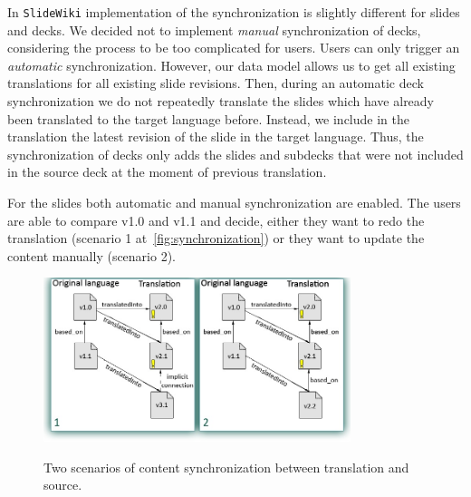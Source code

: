 \documentclass[PhD, Submit, ngerman,UKenglish,table]{scrbook}
\begin{document}
In \texttt{SlideWiki} implementation of the synchronization is slightly different for slides and decks. 
We decided not to implement \emph{manual} synchronization of decks, considering the process to be too complicated for users.
Users can only trigger an \emph{automatic} synchronization.
However, our  data model allows us to get all existing translations for all existing slide revisions.
Then, during an automatic deck synchronization we do not repeatedly translate the slides which have already been translated to the target language before.
Instead, we include in the translation the latest revision of the slide in the target language.
Thus, the synchronization of decks only adds the slides and subdecks that were not included in the source deck at the moment of previous translation.

For the slides both automatic and manual synchronization are enabled.
The users are able to compare v1.0 and v1.1 and decide, either they want to redo the translation (scenario 1 at~\autoref{fig:synchronization}) or they want to update the content manually (scenario 2).

\begin{figure}[!ht]
\centering
\includegraphics[width=0.8\textwidth]{Images/translation-logic.jpg}\\
\caption{Two scenarios of content synchronization between translation and source.}
\label{fig:synchronization}
\end{figure}
\end{document}
